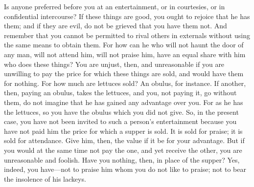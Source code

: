 Is anyone  preferred before you  at an entertainment,  or in courtesies,  or in
confidential intercourse? If  these things are good, you ought  to rejoice that
he has them;  and if they are evil,  do not be grieved that you  have them not.
And remember that you cannot be  permitted to rival others in externals without
using the same means to obtain them. For how can he who will not haunt the door
of any man, will not attend him, will  not praise him, have an equal share with
him who does  these things? You are  unjust, then, and unreasonable  if you are
unwilling to pay the price for which these things are sold, and would have them
for  nothing. For  how much  are  lettuces sold?  An obulus,  for instance.  If
another, then, paying an obulus, takes the lettuces, and you, not paying it, go
without them, do not imagine that he  has gained any advantage over you. For as
he has the lettuces, so you have the  obulus which you did not give. So, in the
present  case, you  have  not been  invited to  such  a person's  entertainment
because you have not paid him the price  for which a supper is sold. It is sold
for praise; it is  sold for attendance. Give him, then, the value  if it be for
your advantage.  But if you  would at the  same time not  pay the one,  and yet
receive the other, you are unreasonable and foolish. Have you nothing, then, in
place of the supper? Yes, indeed, you  have---not to praise him whom you do not
like to praise; not to bear the insolence of his lackeys.
